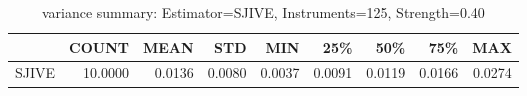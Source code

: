 \begin{table}[ht]
\centering
\caption{variance summary: Estimator=SJIVE, Instruments=125, Strength=0.40}
\begin{tabular}{lrrrrrrrr}
\toprule
 & COUNT & MEAN & STD & MIN & 25\% & 50\% & 75\% & MAX \\
\midrule
SJIVE & 10.0000 & 0.0136 & 0.0080 & 0.0037 & 0.0091 & 0.0119 & 0.0166 & 0.0274 \\
\bottomrule
\end{tabular}
\end{table}
